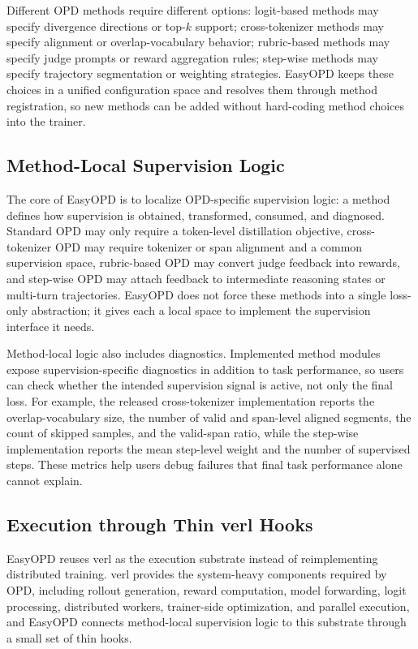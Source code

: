 Different OPD methods require different options: logit-based methods may specify divergence directions or top-$k$ support; cross-tokenizer methods may specify alignment or overlap-vocabulary behavior; rubric-based methods may specify judge prompts or reward aggregation rules; step-wise methods may specify trajectory segmentation or weighting strategies. EasyOPD keeps these choices in a unified configuration space and resolves them through method registration, so new methods can be added without hard-coding method choices into the trainer.

\subsection{Method-Local Supervision Logic}

The core of EasyOPD is to localize OPD-specific supervision logic: a method defines how supervision is obtained, transformed, consumed, and diagnosed. Standard OPD may only require a token-level distillation objective, cross-tokenizer OPD may require tokenizer or span alignment and a common supervision space, rubric-based OPD may convert judge feedback into rewards, and step-wise OPD may attach feedback to intermediate reasoning states or multi-turn trajectories. EasyOPD does not force these methods into a single loss-only abstraction; it gives each a local space to implement the supervision interface it needs.

Method-local logic also includes diagnostics. Implemented method modules expose supervision-specific diagnostics in addition to task performance, so users can check whether the intended supervision signal is active, not only the final loss. For example, the released cross-tokenizer implementation reports the overlap-vocabulary size, the number of valid and span-level aligned segments, the count of skipped samples, and the valid-span ratio, while the step-wise implementation reports the mean step-level weight and the number of supervised steps. These metrics help users debug failures that final task performance alone cannot explain.

\subsection{Execution through Thin verl Hooks}

EasyOPD reuses verl as the execution substrate instead of reimplementing distributed training. verl provides the system-heavy components required by OPD, including rollout generation, reward computation, model forwarding, logit processing, distributed workers, trainer-side optimization, and parallel execution, and EasyOPD connects method-local supervision logic to this substrate through a small set of thin hooks.

